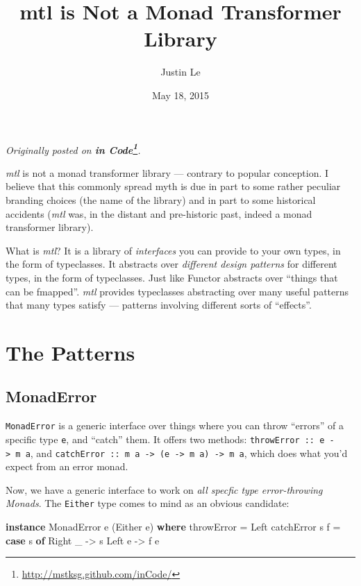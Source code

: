 \documentclass[]{article}
\title{mtl is Not a Monad Transformer Library}
\author{Justin Le}
\date{May 18, 2015}
\newenvironment{Shaded}{}{}
\newcommand{\KeywordTok}[1]{\textcolor[rgb]{0.00,0.44,0.13}{\textbf{{#1}}}}
\newcommand{\DataTypeTok}[1]{\textcolor[rgb]{0.56,0.13,0.00}{{#1}}}
\newcommand{\OtherTok}[1]{\textcolor[rgb]{0.00,0.44,0.13}{{#1}}}
\newcommand{\FunctionTok}[1]{\textcolor[rgb]{0.02,0.16,0.49}{{#1}}}
\newcommand{\NormalTok}[1]{{#1}}
\renewcommand{\href}[2]{#2\footnote{\url{#1}}}
\begin{document}
\maketitle

\emph{Originally posted on
\textbf{\href{http://mstksg.github.com/inCode/}{in Code}}.}

\emph{mtl} is not a monad transformer library --- contrary to popular
conception. I believe that this commonly spread myth is due in part to
some rather peculiar branding choices (the name of the library) and in
part to some historical accidents (\emph{mtl} was, in the distant and
pre-historic past, indeed a monad transformer library).

What is \emph{mtl}? It is a library of \emph{interfaces} you can provide
to your own types, in the form of typeclasses. It abstracts over
\emph{different design patterns} for different types, in the form of
typeclasses. Just like Functor abstracts over ``things that can be
fmapped''. \emph{mtl} provides typeclasses abstracting over many useful
patterns that many types satisfy --- patterns involving different sorts
of ``effects''.

\section{The Patterns}\label{the-patterns}

\subsection{MonadError}\label{monaderror}

\texttt{MonadError} is a generic interface over things where you can
throw ``errors'' of a specific type \texttt{e}, and ``catch'' them. It
offers two methods: \texttt{throwError\ ::\ e\ -\textgreater{}\ m\ a},
and
\texttt{catchError\ ::\ m\ a\ -\textgreater{}\ (e\ -\textgreater{}\ m\ a)\ -\textgreater{}\ m\ a},
which does what you'd expect from an error monad.

Now, we have a generic interface to work on \emph{all specfic type
error-throwing Monads}. The \texttt{Either} type comes to mind as an
obvious candidate:

\begin{Shaded}
\begin{Highlighting}[]
\KeywordTok{instance} \DataTypeTok{MonadError} \NormalTok{e (}\DataTypeTok{Either} \NormalTok{e) }\KeywordTok{where}
    \NormalTok{throwError }\FunctionTok{=} \DataTypeTok{Left}
    \NormalTok{catchError s f }\FunctionTok{=} \KeywordTok{case} \NormalTok{s }\KeywordTok{of}
                       \DataTypeTok{Right} \NormalTok{_ }\OtherTok{->} \NormalTok{s}
                       \DataTypeTok{Left} \NormalTok{e  }\OtherTok{->} \NormalTok{f e}
\end{Highlighting}
\end{Shaded}
\end{document}
